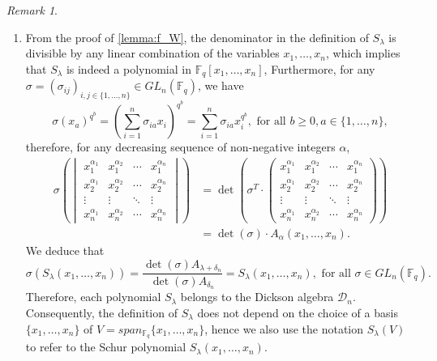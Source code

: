 \documentclass[12pt,a4paper]{report}
\theoremstyle{definition}
\theoremstyle{remark}
\newtheorem*{remark}{Remark}
\theoremstyle{definition}
\begin{document}
\begin{remark}
\begin{enumerate}
    \item From the proof of \cref{lemma:f_W}, the denominator in the definition of $S_{\lambda}$ is divisible by any linear combination of the variables $x_1, \ldots, x_n$, which implies that $S_{\lambda}$ is indeed a polynomial in $\mathbb{F}_q[x_1, \ldots, x_n]$, Furthermore, for any $\sigma=(\sigma_{ij})_{i, j\in \{1, \ldots, n\}}\in GL_n(\mathbb{F}_q)$, we have 
    \begin{equation*}
        \sigma(x_a)^{q^b} = \left(\sum\limits_{i=1}^{n}\sigma_{ia}x_i\right)^{q^b} =\sum\limits_{i=1}^{n}\sigma_{ia}x_i^{q^b}, \text{ for all } b\geq 0, a\in \{1, \ldots, n\}, 
    \end{equation*}
    therefore, for any decreasing sequence of non-negative integers $\alpha$, 
    \begin{align*}
        \sigma\left(\begin{vmatrix}
            x_1^{\alpha_1} & x_1^{\alpha_2} & \cdots  & x_1^{\alpha_n}\\
            x_2^{\alpha_1} & x_2^{\alpha_2} & \cdots  & x_2^{\alpha_n}\\
            \vdots & \vdots & \ddots & \vdots \\
            x_n^{\alpha_1} & x_n^{\alpha_2} & \cdots  & x_n^{\alpha_n}
        \end{vmatrix}\right) &=\det\left(\sigma^T \cdot \begin{pmatrix}
            x_1^{\alpha_1} & x_1^{\alpha_2} & \cdots  & x_1^{\alpha_n}\\
            x_2^{\alpha_1} & x_2^{\alpha_2} & \cdots  & x_2^{\alpha_n}\\
            \vdots & \vdots & \ddots & \vdots \\
            x_n^{\alpha_1} & x_n^{\alpha_2} & \cdots  & x_n^{\alpha_n}
\end{pmatrix}\right)\\
&= \det(\sigma)\cdot A_{\alpha}(x_1, \ldots, x_n).
    \end{align*}
    We deduce that
    \begin{equation*}
        \sigma(S_{\lambda}(x_1, \ldots, x_n)) = \dfrac{\det(\sigma)A_{\lambda+\delta_n}}{\det(\sigma)A_{\delta_n}} = S_{\lambda}(x_1, \ldots, x_n), \text{ for all } \sigma\in GL_n(\mathbb{F}_q).
    \end{equation*}
    Therefore, each polynomial $S_{\lambda}$ belongs to the Dickson algebra $\mathcal{D}_n$. Consequently, the definition of $S_{\lambda}$ does not depend on the choice of a basis $\{x_1, \ldots, x_n\}$ of $V = span_{\mathbb{F}_q}\{x_1, \ldots, x_n\}$, hence we also use the notation $S_{\lambda}(V)$ to refer to the Schur polynomial $S_{\lambda}(x_1, \ldots, x_n)$.

\end{enumerate}
\end{remark}
\end{document}
